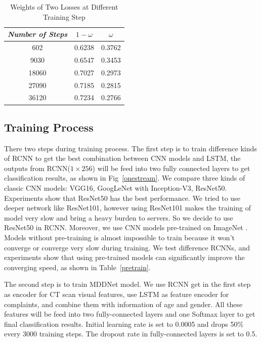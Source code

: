 \begin{table}[t]
    \vspace{-0cm}
    \caption{Weights of Two Losses at Different Training Step}
    \vspace{-0cm}
    \begin{center}
    \begin{tabular}{|c|c|c|}
    \hline
    \textbf{\textit{Number of Steps}} & \textbf{\textit{$1 - \omega$}} & \textbf{\textit{$\omega$}}\\
    \hline
    602 &0.6238 & 0.3762  \\
    9030 &0.6547 & 0.3453  \\
    18060 &0.7027 & 0.2973  \\
    27090 &0.7185 & 0.2815  \\
    36120 &0.7234 & 0.2766  \\

    \hline
    \end{tabular}
    \vspace{-0cm}
    \label{weights}
    \end{center}
    \vspace{-0cm}
    \end{table}

\subsection{Training Process}
\label{trainingprocess}
There two steps during training process.
The first step is to train difference kinds of RCNN to get the best combination between CNN models and LSTM, the outputs from RCNN($1 \times 256$) will be feed into two fully connected layers to get classification results, as shown in Fig~\ref{onestream}. We compare three kinds of classic CNN models: VGG16, GoogLeNet with Inception-V3, ResNet50. Experiments show that ResNet50 has the best performance. We tried to use deeper network like ResNet101, however using ResNet101 makes the training of model very slow and bring a heavy burden to servers. So we decide to use ResNet50 in RCNN. Moreover, we use CNN models pre-trained on ImageNet \cite{ILSVRC15}. Models without pre-training is almost impossible to train because it won't converge or converge very slow during training. We test difference RCNNs, and experiments show that using pre-trained models can significantly improve the converging speed, as shown in Table~\ref{pretrain}.

The second step is to train MDDNet model. We use RCNN get in the first step as encoder for CT scan visual features, use LSTM as feature encoder for complaints, and combine them with information of age and gender. All these features will be feed into two fully-connected layers and one Softmax layer to get final classification results. Initial learning rate is set to 0.0005 and drops 50\% every 3000 training steps. The dropout rate in fully-connected layers is set to 0.5.

